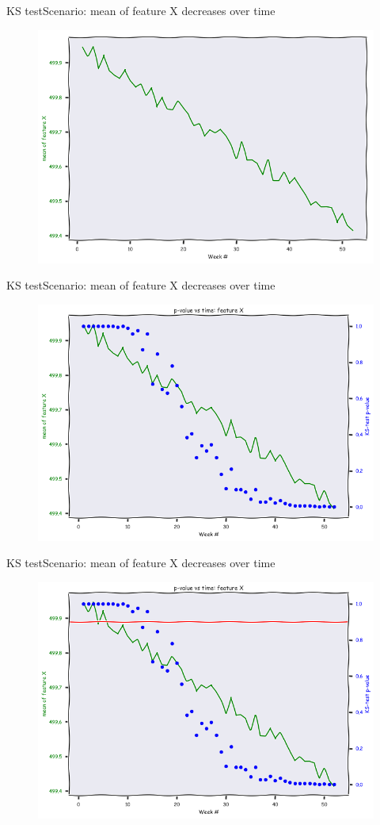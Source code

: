 \documentclass{beamer}
\begin{document}
\begin{frame}{KS test}{Scenario: mean of feature X decreases over time}
	\begin{figure}
		\centering
		\includegraphics[width=0.7\linewidth]{ks_ex_1.png}
	\end{figure}
\end{frame}

\begin{frame}{KS test}{Scenario: mean of feature X decreases over time}
	\begin{figure}
		\centering
		\includegraphics[width=0.7\linewidth]{ks_ex_2.png}
	\end{figure}
\end{frame}

\begin{frame}{KS test}{Scenario: mean of feature X decreases over time}
	\begin{figure}
		\centering
		\includegraphics[width=0.7\linewidth]{ks_ex_3.png}
	\end{figure}
\end{frame}
\end{document}
